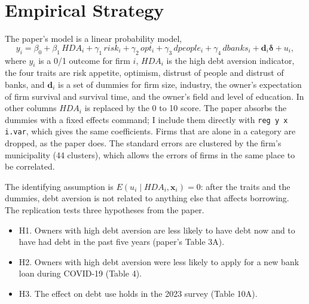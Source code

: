 \documentclass[preprint,letterpaper,11pt,authoryear]{elsarticle}
\begin{document}
\section{Empirical Strategy}

The paper's model is a linear probability model,
\begin{equation}
\label{eq:lpm}
y_i = \beta_0 + \beta_1 \, HDA_i + \gamma_1 \, risk_i + \gamma_2 \, opt_i + \gamma_3 \, dpeople_i + \gamma_4 \, dbanks_i + \mathbf{d}_i\boldsymbol{\delta} + u_i,
\end{equation}
where $y_i$ is a 0/1 outcome for firm $i$, $HDA_i$ is the high debt aversion indicator, the four traits are risk appetite, optimism, distrust of people and distrust of banks, and $\mathbf{d}_i$ is a set of dummies for firm size, industry, the owner's expectation of firm survival and survival time, and the owner's field and level of education. In other columns $HDA_i$ is replaced by the 0 to 10 score. The paper absorbs the dummies with a fixed effects command; I include them directly with \texttt{reg y x i.var}, which gives the same coefficients. Firms that are alone in a category are dropped, as the paper does. The standard errors are clustered by the firm's municipality (44 clusters), which allows the errors of firms in the same place to be correlated.

The identifying assumption is $E(u_i \mid HDA_i, \mathbf{x}_i) = 0$: after the traits and the dummies, debt aversion is not related to anything else that affects borrowing. The replication tests three hypotheses from the paper.
\begin{itemize}
\item H1. Owners with high debt aversion are less likely to have debt now and to have had debt in the past five years (paper's Table 3A).
\item H2. Owners with high debt aversion were less likely to apply for a new bank loan during COVID-19 (Table 4).
\item H3. The effect on debt use holds in the 2023 survey (Table 10A).
\end{itemize}
\end{document}
